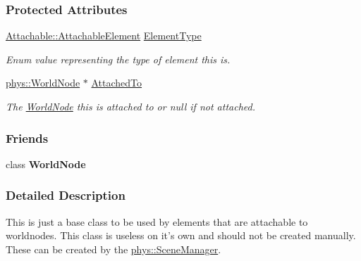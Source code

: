 \subsubsection*{Protected Attributes}
\begin{DoxyCompactItemize}
\item 
\hyperlink{classphys_1_1Attachable_acd1fca033e7cc0bb3024a92d466d213a}{Attachable::AttachableElement} \hyperlink{classphys_1_1Attachable_af574d5f08a304c6e0ae002bb2fc057c7}{ElementType}
\begin{DoxyCompactList}\small\item\em Enum value representing the type of element this is. \item\end{DoxyCompactList}\item 
\hypertarget{classphys_1_1Attachable_ac781addd4313b292b7f6bf87015286fd}{
\hyperlink{classphys_1_1WorldNode}{phys::WorldNode} $\ast$ \hyperlink{classphys_1_1Attachable_ac781addd4313b292b7f6bf87015286fd}{AttachedTo}}
\label{classphys_1_1Attachable_ac781addd4313b292b7f6bf87015286fd}

\begin{DoxyCompactList}\small\item\em The \hyperlink{classphys_1_1WorldNode}{WorldNode} this is attached to or null if not attached. \item\end{DoxyCompactList}\end{DoxyCompactItemize}
\subsubsection*{Friends}
\begin{DoxyCompactItemize}
\item 
\hypertarget{classphys_1_1Attachable_a1cacd07efb11226da49a7c80569b18e8}{
class {\bfseries WorldNode}}
\label{classphys_1_1Attachable_a1cacd07efb11226da49a7c80569b18e8}

\end{DoxyCompactItemize}


\subsubsection{Detailed Description}
This is just a base class to be used by elements that are attachable to worldnodes. This class is useless on it's own and should not be created manually. These can be created by the \hyperlink{classphys_1_1SceneManager}{phys::SceneManager}. 

